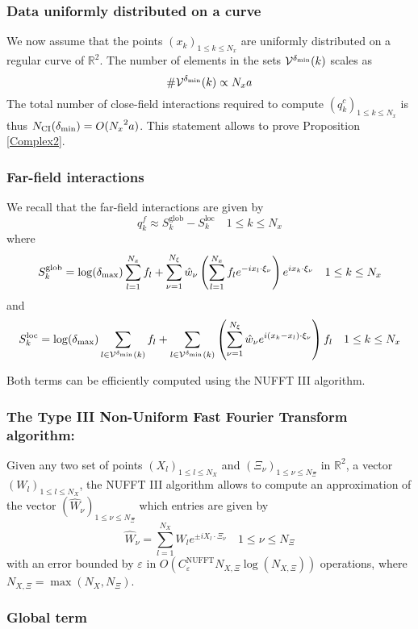 \documentclass[11pt,a4paper]{article}
\begin{document}
\subsubsection*{Data uniformly distributed on a curve}

We now assume that the points $(x_k)_{1\leq k \leq {N_x}}$ are uniformly distributed on a regular curve of $\mathbb{R}^2$. The number of elements in the sets $\mathcal{V}^{\delta_{\min}}(k)$ scales as  
\[\#\mathcal{V}^{\delta_{\min}}(k) \propto {N_x} a\]
The total number of close-field interactions required to compute $(q_k^c)_{1 \leq k \leq {N_x}}$ is thus $N_{\text{CI}}(\delta_{\min}) = O({N_x}^2 a)$. This statement allows to prove Proposition \ref{Complex2}.

\subsubsection{Far-field interactions}

We recall that the far-field interactions are given by  
\[ q_k^{f} \approx S^{\text{glob}}_k - S^{\text{loc}}_k \quad 1\leq k \leq N_x\]
where 
\[S^{\text{glob}}_k = \log(\delta_{\max})\sum_{l=1}^{N_x}f_l +  \sum_{\nu = 1}^{N_\xi}\hat{w}_{\nu} \left(\sum_{l=1}^{N_x} f_l e^{- i x_l \cdot \xi_\nu} \right) e^{i x_k\cdot \xi_\nu} \quad 1\leq k \leq N_x\]
and
\[S^{\text{loc}}_k = \log(\delta_{\max})\sum_{l\in \mathcal{V}^{\delta_{\min}}(k)}f_l +  \sum_{l\in \mathcal{V}^{\delta_{\min}}(k)}\left( \sum_{\nu=1}^{N_{\xi}} \hat{w}_{\nu} e^{i (x_k-x_l) \cdot \xi_\nu} \right)f_l \quad 1\leq k \leq N_x\]

Both terms can be efficiently computed using the NUFFT III algorithm.

\subsubsection*{The Type III Non-Uniform Fast Fourier Transform algorithm:} 
Given any two set of points $(X_l)_{1 \leq l \leq N_X}$ and $(\Xi_\nu)_{1 \leq \nu \leq N_{\Xi}}$ in $\mathbb{R}^2$, a vector $(W_l)_{1 \leq l \leq N_X}$, the NUFFT III algorithm allows to compute an approximation of the vector $\left(\hat{W}_\nu\right)_{1\leq \nu \leq N_{\Xi}}$ which entries are given by
\[ \hat{W}_\nu = \sum_{l=1}^{N_X} W_l e^{\pm i X_l \cdot \Xi_\nu} \quad 1\leq \nu \leq N_\Xi\]
with an error bounded by $\varepsilon$ in $O\left(C^{\text{NUFFT}}_{\varepsilon}N_{X,\Xi} \log (N_{X,\Xi})\right)$ operations, where $N_{X,\Xi} = \max(N_X,N_{\Xi})$. 

\subsubsection*{Global term}
\end{document}
